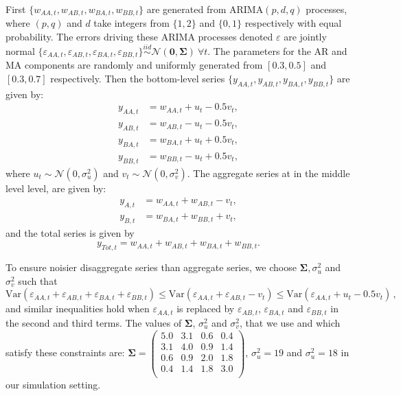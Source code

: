 \documentclass[a4paper, 11pt]{article}
\theoremstyle{theo}
\theoremstyle{definition}
\begin{document}
First $\{w_{AA,t},w_{AB,t},w_{BA,t},w_{BB,t}\}$ are generated from ARIMA$(p,d,q)$ processes, where $(p,q)$ and $d$ take integers from $\{1,2\}$ and $\{0,1\}$ respectively with equal probability. The errors driving these ARIMA processes denoted $\varepsilon$ are jointly normal $\{\varepsilon_{AA,t},\varepsilon_{AB,t},\varepsilon_{BA,t},\varepsilon_{BB,t}\} \overset{iid}{\sim} \mathcal{N}(\bm{0}, \bm{\Sigma})~\forall t$. The parameters for the AR and MA components are randomly and uniformly generated from $[0.3,0.5]$ and $[0.3,0.7]$ respectively. Then the bottom-level series $\{y_{AA,t},y_{AB,t},y_{BA,t},y_{BB,t}\}$ are given by:
\begin{align*}
y_{AA,t} &= w_{AA,t} + u_t - 0.5v_t,\\
y_{AB,t} &= w_{AB,t} - u_t - 0.5v_t,\\
y_{BA,t} &= w_{BA,t} + u_t + 0.5v_t,\\
y_{BB,t} &= w_{BB,t} - u_t + 0.5v_t,
\end{align*}
where $u_t \sim \mathcal{N}(0,\sigma^2_u)$ and $v_t \sim \mathcal{N}(0,\sigma^2_v)$.
The aggregate series at in the middle level level, are given by:
\begin{align*}
y_{A,t} &= w_{AA,t} + w_{AB,t} - v_t,\\
y_{B,t} &= w_{BA,t} + w_{BB,t} + v_t,
\end{align*}
and the total series is given by
$$y_{Tot,t} = w_{AA,t} + w_{AB,t} + w_{BA,t} + w_{BB,t}.$$

To ensure noisier disaggregate series than aggregate series, we choose $\bm{\Sigma}, \sigma^2_u$ and $\sigma^2_v$ such that
$$
\text{Var}(\varepsilon_{AA,t}+\varepsilon_{AB,t}+\varepsilon_{BA,t}+\varepsilon_{BB,t}) \le \text{Var}(\varepsilon_{AA,t}+\varepsilon_{AB,t}-v_t) \le \text{Var}(\varepsilon_{AA,t}+u_t-0.5v_t)\,,
$$
and similar inequalities hold when $\varepsilon_{AA,t}$ is replaced by $\varepsilon_{AB,t}$, $\varepsilon_{BA,t}$ and $\varepsilon_{BB,t}$ in the second and third terms.
The values of $\bm{\Sigma}$, $\sigma^2_u$ and $\sigma^2_v$, that we use and which satisfy these constraints are:
$\bm{\Sigma} =
\begin{pmatrix}
5.0 & 3.1 & 0.6 & 0.4 \\
3.1 & 4.0 & 0.9 & 1.4 \\
0.6 & 0.9 & 2.0 & 1.8 \\
0.4 & 1.4 & 1.8 & 3.0 \\
\end{pmatrix}$,
$\sigma^2_u = 19$ and $\sigma^2_u = 18$ in our simulation setting.
\end{document}
